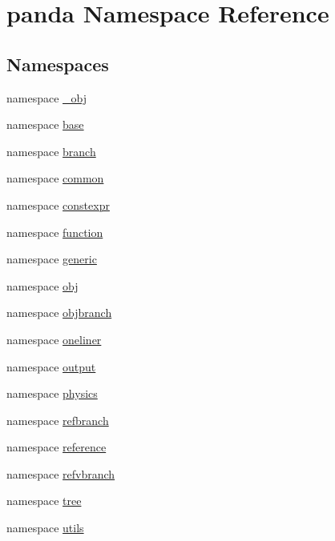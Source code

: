 \hypertarget{namespacepanda}{
\section{panda Namespace Reference}
\label{namespacepanda}
}
\subsection*{Namespaces}
\begin{DoxyCompactItemize}
\item 
namespace \hyperlink{namespacepanda_1_1__obj}{\_\-obj}
\item 
namespace \hyperlink{namespacepanda_1_1base}{base}
\item 
namespace \hyperlink{namespacepanda_1_1branch}{branch}
\item 
namespace \hyperlink{namespacepanda_1_1common}{common}
\item 
namespace \hyperlink{namespacepanda_1_1constexpr}{constexpr}
\item 
namespace \hyperlink{namespacepanda_1_1function}{function}
\item 
namespace \hyperlink{namespacepanda_1_1generic}{generic}
\item 
namespace \hyperlink{namespacepanda_1_1obj}{obj}
\item 
namespace \hyperlink{namespacepanda_1_1objbranch}{objbranch}
\item 
namespace \hyperlink{namespacepanda_1_1oneliner}{oneliner}
\item 
namespace \hyperlink{namespacepanda_1_1output}{output}
\item 
namespace \hyperlink{namespacepanda_1_1physics}{physics}
\item 
namespace \hyperlink{namespacepanda_1_1refbranch}{refbranch}
\item 
namespace \hyperlink{namespacepanda_1_1reference}{reference}
\item 
namespace \hyperlink{namespacepanda_1_1refvbranch}{refvbranch}
\item 
namespace \hyperlink{namespacepanda_1_1tree}{tree}
\item 
namespace \hyperlink{namespacepanda_1_1utils}{utils}
\end{DoxyCompactItemize}
